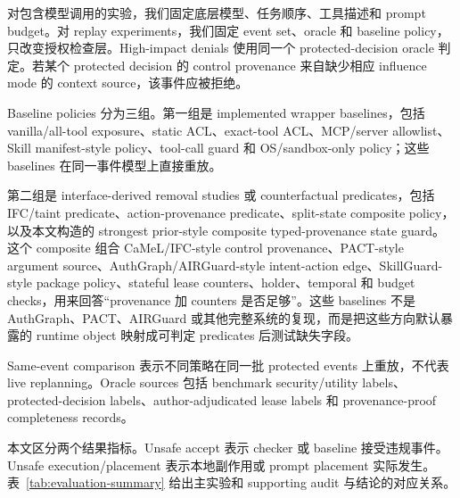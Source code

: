 \documentclass[UTF8,a4paper,11pt]{ctexart}
\begin{document}
对包含模型调用的实验，我们固定底层模型、任务顺序、工具描述和 prompt budget。对 replay experiments，我们固定 event set、oracle 和 baseline policy，只改变授权检查层。High-impact denials 使用同一个 protected-decision oracle 判定。若某个 protected decision 的 control provenance 来自缺少相应 influence mode 的 context source，该事件应被拒绝。

Baseline policies 分为三组。第一组是 implemented wrapper baselines，包括 vanilla/all-tool exposure、static ACL、exact-tool ACL、MCP/server allowlist、Skill manifest-style policy、tool-call guard 和 OS/sandbox-only policy；这些 baselines 在同一事件模型上直接重放。

第二组是 interface-derived removal studies 或 counterfactual predicates，包括 IFC/taint predicate、action-provenance predicate、split-state composite policy，以及本文构造的 strongest prior-style composite typed-provenance state guard。这个 composite 组合 CaMeL/IFC-style control provenance、PACT-style argument source、AuthGraph/AIRGuard-style intent-action edge、SkillGuard-style package policy、stateful lease counters、holder、temporal 和 budget checks，用来回答“provenance 加 counters 是否足够”。这些 baselines 不是 AuthGraph、PACT、AIRGuard 或其他完整系统的复现，而是把这些方向默认暴露的 runtime object 映射成可判定 predicates 后测试缺失字段。

Same-event comparison 表示不同策略在同一批 protected events 上重放，不代表 live replanning。Oracle sources 包括 benchmark security/utility labels、protected-decision labels、author-adjudicated lease labels 和 provenance-proof completeness records。

本文区分两个结果指标。Unsafe accept 表示 checker 或 baseline 接受违规事件。Unsafe execution/placement 表示本地副作用或 prompt placement 实际发生。表~\ref{tab:evaluation-summary} 给出主实验和 supporting audit 与结论的对应关系。
\end{document}
